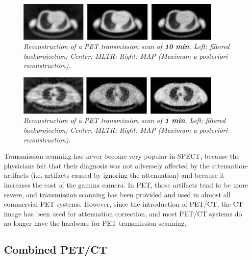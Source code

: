 \documentclass[11pt,oneside]{article}
\begin{document}
\begin{figure}[tb]
\centering
\includegraphics[width=0.9\textwidth]{figs/fig_pettranslang.pdf}
\caption{\label{fig:pettranslang} \emph{Reconstruction of a PET transmission
scan of {\bf 10 min}. Left: filtered backprojection; Center: MLTR; Right: MAP
(Maximum a posteriori reconstruction).}}
\end{figure}

\begin{figure}[tb]
\centering
\includegraphics[width=0.9\textwidth]{figs/fig_pettranskort.pdf}
\caption{\label{fig:pettranskort} \emph{Reconstruction of a PET transmission
scan of {\bf 1 min}. Left: filtered backprojection; Center: MLTR; Right: MAP
(Maximum a posteriori reconstruction).}}
\end{figure}

Transmission scanning has never become very popular in SPECT, because
the physicians felt that their diagnosis was not adversely affected by
the attenuation-artifacts (i.e. artifacts caused by ignoring the
attenuation) and because it increases the cost of the gamma camera. In
PET, those artifacts tend to be more severe, and transmission scanning
has been provided and used in almost all commercial PET
systems. However, since the introduction of PET/CT, the CT image has
been used for attenuation correction, and most PET/CT systems do no
longer have the hardware for PET transmission scanning.

\subsection{Combined PET/CT}
\end{document}
